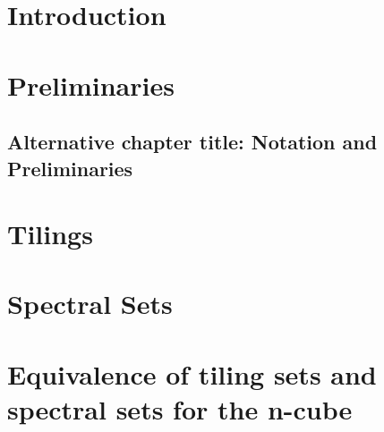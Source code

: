 \documentclass[british, oneside]{ntnuthesis}
\begin{document}
    



    \chapter{Introduction}
        

    \chapter{Preliminaries}
    \section*{Alternative chapter title: Notation and Preliminaries}
        
    
    \chapter{Tilings}
        

    \chapter{Spectral Sets}
        
    
    \chapter{Equivalence of tiling sets and spectral sets for the n-cube}
        


    \printbibliography
\end{document}

